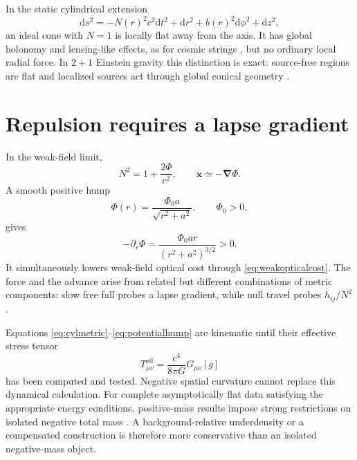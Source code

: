 \documentclass[aps,prd,twocolumn,amsmath,amssymb,nofootinbib]{revtex4-2}
\newcommand{\dd}{\mathrm{d}}
\newcommand{\eff}{\mathrm{eff}}
\begin{document}
In the static cylindrical extension
\begin{equation}
 \dd s^2=-N(r)^2c^2\dd t^2+\dd r^2+b(r)^2\dd\phi^2+\dd z^2,
 \label{eq:cylmetric}
\end{equation}
an ideal cone with $N=1$ is locally flat away from the axis.  It has global
holonomy and lensing-like effects, as for cosmic strings
\cite{vilenkin-1981}, but no ordinary local radial force.  In $2+1$ Einstein
gravity this distinction is exact: source-free regions are flat and localized
sources act through global conical geometry \cite{deser-jackiw-thooft-1984}.

\section{Repulsion requires a lapse gradient}
\label{sec:lapse}

In the weak-field limit,
\begin{equation}
 N^2=1+\frac{2\Phi}{c^2},
 \qquad \ddot{\boldsymbol{x}}\simeq-\boldsymbol{\nabla}\Phi.
 \label{eq:newtonianlimit}
\end{equation}
A smooth positive hump
\begin{equation}
 \Phi(r)=\frac{\Phi_0a}{\sqrt{r^2+a^2}},
 \qquad \Phi_0>0,
 \label{eq:potentialhump}
\end{equation}
gives
\begin{equation}
 -\partial_r\Phi
 =\frac{\Phi_0ar}{(r^2+a^2)^{3/2}}>0.
 \label{eq:outwardacc}
\end{equation}
It simultaneously lowers weak-field optical cost through
\eqref{eq:weakopticalcost}.  The force and the advance arise from related but
different combinations of metric components: slow free fall probes a lapse
gradient, while null travel probes $h_{ij}/N^2$.

Equations \eqref{eq:cylmetric}--\eqref{eq:potentialhump} are kinematic until
their effective stress tensor
\begin{equation}
 T^{\eff}_{\mu\nu}=\frac{c^4}{8\pi G}G_{\mu\nu}[g]
\end{equation}
has been computed and tested.  Negative spatial curvature cannot replace this
dynamical calculation.  For complete asymptotically flat data satisfying the
appropriate energy conditions, positive-mass results impose strong
restrictions on isolated negative total mass \cite{schoen-yau-1979}.  A
background-relative underdensity or a compensated construction is therefore
more conservative than an isolated negative-mass object.
\end{document}
